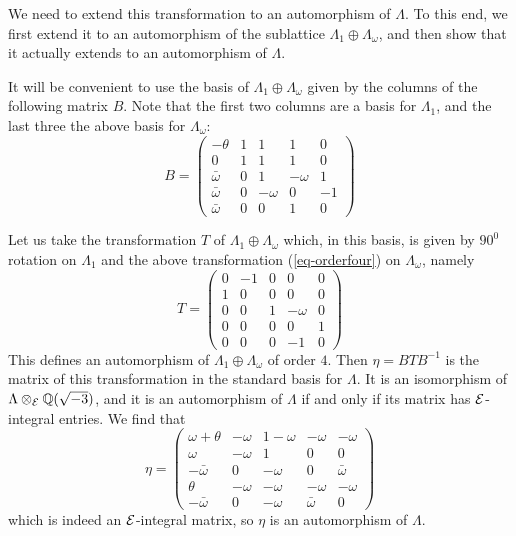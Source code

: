 \documentclass[11pt]{amsart}
\begin{document}
We need to extend this transformation to an automorphism of $\Lambda$.  To this end, we first extend it to an automorphism of the sublattice $\Lambda_1\oplus\Lambda_\omega$, and then show that it actually extends to an automorphism of $\Lambda$.

It will be convenient to use the basis of $\Lambda_1\oplus\Lambda_\omega$ given by the columns of the following matrix $B$.  Note that the first two columns are a basis for $\Lambda_1$, and the last three the above basis for $\Lambda_\omega$:
\begin{equation}
\label{eq-basis}
B = \left(\begin{array}{ccccc} -\theta & 1 & 1 & 1 & 0 \\0 & 1 & 1 & 1 & 0 \\\bar\omega & 0 & 1 & -\omega & 1 \\ \bar\omega & 0 & -\omega & 0 & -1 \\ \bar\omega & 0 & 0 & 1 & 0\end{array}\right)
\end{equation}

  Let us take the transformation $T$ of $\Lambda_1\oplus\Lambda_\omega$ which, in this basis, is given by $90^0$ rotation on $\Lambda_1$ and the above transformation (\ref{eq-orderfour}) on $\Lambda_\omega$, namely
  \begin{equation}
  \label{eq-splittransformation}
 T = \left(\begin{array}{ccccc}0 & -1 & 0 & 0 & 0 \\ 1 & 0 & 0 & 0 & 0 \\0 & 0 & 1 & -\omega & 0 \\0 & 0 & 0 & 0 & 1 \\0 & 0 & 0 & -1 & 0\end{array}\right) 
  \end{equation}
This defines an automorphism of $\Lambda_1\oplus\Lambda_\omega$ of order $4$.   
Then $\eta = BTB^{-1}$ is the matrix of this transformation in the standard basis for $\Lambda$.  It is an isomorphism of $\Lambda\otimes_{\mathcal E} {\mathbb Q}(\sqrt{-3})$, and it is an automorphism of $\Lambda$ if and only if its matrix has ${\mathcal E}$- integral entries.   We find that
\begin{equation}
\label{eq-integrality}
\eta = \left(\begin{array}{ccccc} \omega + \theta & -\omega & 1-\omega & -\omega & -\omega \\ \omega & -\omega & 1 & 0 & 0 \\ -\bar\omega & 0 & -\omega & 0 & \bar\omega \\ \theta & -\omega & -\omega & -\omega & -\omega \\ -\bar\omega & 0 & -\omega & \bar\omega & 0\end{array}\right)
\end{equation}
which is indeed an ${\mathcal E}$-integral matrix, so $\eta$ is an automorphism of $\Lambda$. 
\end{document}
